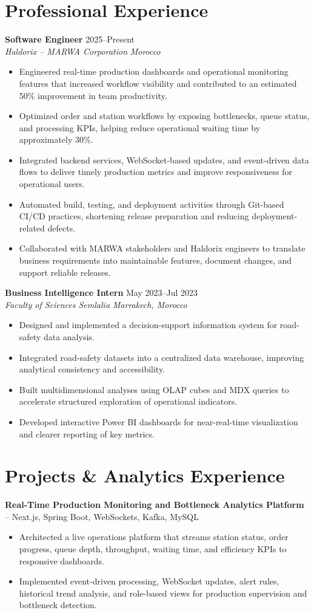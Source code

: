\documentclass[11pt]{article}
\newcommand{\role}[4]{%
  \textbf{#1} \hfill #2\\
  \textit{#3} \hfill \textit{#4}
}
\begin{document}
\section{Professional Experience}
\role{Software Engineer}{2025--Present}{Haldorix -- MARWA Corporation}{Morocco}
\begin{itemize}
  \item Engineered real-time production dashboards and operational monitoring features that increased workflow visibility and contributed to an estimated 50\% improvement in team productivity.
  \item Optimized order and station workflows by exposing bottlenecks, queue status, and processing KPIs, helping reduce operational waiting time by approximately 30\%.
  \item Integrated backend services, WebSocket-based updates, and event-driven data flows to deliver timely production metrics and improve responsiveness for operational users.
  \item Automated build, testing, and deployment activities through Git-based CI/CD practices, shortening release preparation and reducing deployment-related defects.
  \item Collaborated with MARWA stakeholders and Haldorix engineers to translate business requirements into maintainable features, document changes, and support reliable releases.
\end{itemize}

\role{Business Intelligence Intern}{May 2023--Jul 2023}{Faculty of Sciences Semlalia}{Marrakech, Morocco}
\begin{itemize}
  \item Designed and implemented a decision-support information system for road-safety data analysis.
  \item Integrated road-safety datasets into a centralized data warehouse, improving analytical consistency and accessibility.
  \item Built multidimensional analyses using OLAP cubes and MDX queries to accelerate structured exploration of operational indicators.
  \item Developed interactive Power BI dashboards for near-real-time visualization and clearer reporting of key metrics.
\end{itemize}

\section{Projects \& Analytics Experience}
\textbf{Real-Time Production Monitoring and Bottleneck Analytics Platform} -- Next.js, Spring Boot, WebSockets, Kafka, MySQL
\begin{itemize}
  \item Architected a live operations platform that streams station status, order progress, queue depth, throughput, waiting time, and efficiency KPIs to responsive dashboards.
  \item Implemented event-driven processing, WebSocket updates, alert rules, historical trend analysis, and role-based views for production supervision and bottleneck detection.
\end{itemize}
\end{document}
